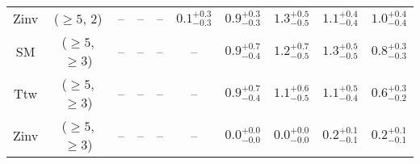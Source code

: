 \begin{table}[h!]
{\begin{tabular}{cccccccccc}
	Zinv & ($\ge5$, 2) & -- & -- & -- & $0.1^{+ 0.3 }_{- 0.3 }$ & $0.9^{+ 0.3 }_{- 0.3 }$ & $1.3^{+ 0.5 }_{- 0.5 }$ & $1.1^{+ 0.4 }_{- 0.4 }$ & $1.0^{+ 0.4 }_{- 0.4 }$ \\[0.5ex] 
	SM & ($\ge5$, $\ge3$) & -- & -- & -- & -- & $0.9^{+ 0.7 }_{- 0.4 }$ & $1.2^{+ 0.7 }_{- 0.5 }$ & $1.3^{+ 0.5 }_{- 0.5 }$ & $0.8^{+ 0.3 }_{- 0.3 }$ \\[0.5ex] 
	Ttw & ($\ge5$, $\ge3$) & -- & -- & -- & -- & $0.9^{+ 0.7 }_{- 0.4 }$ & $1.1^{+ 0.6 }_{- 0.5 }$ & $1.1^{+ 0.5 }_{- 0.4 }$ & $0.6^{+ 0.3 }_{- 0.2 }$ \\[0.5ex] 
	Zinv & ($\ge5$, $\ge3$) & -- & -- & -- & -- & $0.0^{+ 0.0 }_{- 0.0 }$ & $0.0^{+ 0.0 }_{- 0.0 }$ & $0.2^{+ 0.1 }_{- 0.1 }$ & $0.2^{+ 0.1 }_{- 0.1 }$ \\[0.5ex] 
	\hline
	\hline
\end{tabular}}
\end{table}
